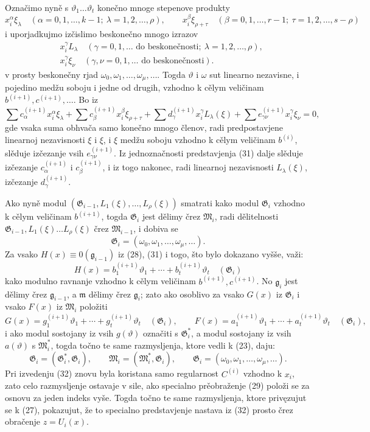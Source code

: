 \documentclass[11pt]{article}
\providecommand{\Gmod}{\mathfrak G}
\providecommand{\Mmod}{\mathfrak M}
\providecommand{\mideal}{\mathfrak m}
\providecommand{\gideal}{\mathfrak g}
\begin{document}
Označimo nyně s $\vartheta_1\ldots\vartheta_t$ konečno mnoge stepenove produkty
\[
 x_i^\alpha\xi_\lambda\quad(\alpha=0,1,\ldots,k-1;\ \lambda=1,2,\ldots,\rho),\qquad
 x_i^\beta\xi_{\rho+\tau}\quad(\beta=0,1,\ldots,r-1;\ \tau=1,2,\ldots,s-\rho)
\]
i uporjadkujmo izčislimo beskonečno mnogo izrazov
\[
\begin{aligned}
 &x_i^\gamma L_\lambda\quad(\gamma=0,1,\ldots\text{ do beskonečnosti};\ \lambda=1,2,\ldots,\rho),\\
 &x_i^\gamma\xi_\nu\quad(\gamma,\nu=0,1,\ldots\text{ do beskonečnosti}).
\end{aligned}
\]
v prosty beskonečny rjad $\omega_0,\omega_1,\ldots,\omega_\mu,\ldots$. Togda $\vartheta$ i $\omega$ sut linearno nezavisne, i pojedino medžu soboju i jedne od drugih, vzhodno k cělym veličinam $b^{(i+1)},c^{(i+1)},\ldots$. Bo iz
\[
 \sum c^{(i+1)}_\alpha x_i^\alpha\xi_\lambda+
 \sum c^{(i+1)}_\beta x_i^\beta\xi_{\rho+\tau}+
 \sum d^{(i+1)}_\gamma x_i^\gamma L_\lambda(\xi)+
 \sum e^{(i+1)}_{\gamma\nu}x_i^\gamma\xi_\nu=0,
\]
gde vsaka suma obhvača samo konečno mnogo členov, radi predpostavjene linearnoj nezavisnosti $\xi$ i $\xi$, i $\xi$ medžu soboju vzhodno k cělym veličinam $b^{(i)}$, slěduje izčezanje vsih $e^{(i+1)}_{\gamma\nu}$. Iz jednoznačnosti predstavjenja (31) dalje slěduje izčezanje $c^{(i+1)}_\alpha$ i $c^{(i+1)}_\beta$, i iz togo nakonec, radi linearnoj nezavisnosti $L_\lambda(\xi)$, izčezanje $d^{(i+1)}_\gamma$.

Ako nyně modul $(\Gmod_{i-1},L_1(\xi),\ldots,L_\rho(\xi))$ smatrati kako modul $\Gmod_i$ vzhodno k cělym veličinam $b^{(i+1)}$, togda $\Gmod_i$ jest dělimy črez $\Mmod_i$, radi dělitelnosti $\Gmod_{i-1},L_1(\xi)\ldots L_\rho(\xi)$ črez $\Mmod_{i-1}$, i dobiva se
\[
 \Gmod_i=(\omega_0,\omega_1,\ldots,\omega_\mu,\ldots).
\]
Za vsako $H(x)\equiv0(\gideal_{i-1})$ iz (28), (31) i togo, što bylo dokazano vyšše, važi:
\[
 H(x)=b^{(i+1)}_1\vartheta_1+\cdots+b^{(i+1)}_t\vartheta_t\quad(\Gmod_i)
\]
kako modulno ravnanje vzhodno k cělym veličinam $b^{(i+1)},c^{(i+1)}$. No $\gideal_i$ jest dělimy črez $\gideal_{i-1}$, a $\mideal$ dělimy črez $\gideal_i$; zato ako osoblivo za vsako $G(x)$ iz $\Gmod_i$ i vsako $F(x)$ iz $\Mmod_i$ položiti
\[
 G(x)=g^{(i+1)}_1\vartheta_1+\cdots+g^{(i+1)}_t\vartheta_t\quad(\Gmod_i),\qquad
 F(x)=a^{(i+1)}_1\vartheta_1+\cdots+a^{(i+1)}_t\vartheta_t\quad(\Gmod_i),
\]
i ako modul sostojany iz vsih $g(\vartheta)$ označiti s $\Gmod_i^*$, a modul sostojany iz vsih $a(\vartheta)$ s $\Mmod_i^*$, togda točno te same razmysljenja, ktore vedli k (23), daju:
\begin{equation}
 \Gmod_i=(\Gmod_i^*,\Gmod_i),\qquad
 \Mmod_i=(\Mmod_i^*,\Gmod_i),\qquad
 \Gmod_i=(\omega_0,\omega_1,\ldots,\omega_\mu,\ldots).
\tag{32}
\end{equation}
Pri izvedenju (32) znovu byla koristana samo regularnost $C^{(i)}$ vzhodno k $x_i$, zato celo razmysljenje ostavaje v sile, ako specialno prěobraženje (29) položi se za osnovu za jeden indeks vyše. Togda točno te same razmysljenja, ktore privęzujut se k (27), pokazujut, že to specialno predstavjenje nastava iz (32) prosto črez obračenje $z=U_i(x)$.
\end{document}
